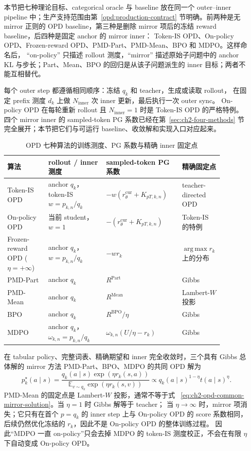 \documentclass[lang=cn,scheme=chinese,openany]{../book/elegantbook}
\DeclareMathOperator*{\argmax}{arg\,max}
\begin{document}
本节把七种理论目标、categorical oracle 与 baseline 放在同一个 outer--inner pipeline 中；生产支持范围由第~\ref{opd:production-contract} 节明确。前两种是无 mirror 正则的 OPD baseline，第三种是删除 mirror 项后的冻结 reward baseline，后四种是固定 anchor 的 mirror inner： Token-IS OPD、On-policy OPD、Frozen-reward OPD、PMD-Part、PMD-Mean、BPO 和 MDPO。这样命名后， ``on-policy'' 只描述 rollout 测度，``mirror'' 描述原始子问题中的 anchor KL 与步长；Part、Mean、BPO 的回归是从该子问题派生的 inner 目标；两者不能互相替代。

每个 outer step 都遵循相同顺序：冻结 $q_k$ 和 teacher，生成或读取 rollout， 在固定 prefix 测度 $d_k$ 上做 $N_{\mathrm{inner}}$ 次 inner 更新，最后执行一次 outer sync。 On-policy OPD 在每轮重新 rollout 且 $N_{\mathrm{inner}}=1$ 时是 Token-IS OPD 的严格特例。四个 mirror inner 的 sampled-token PG 系数已经在第~\ref{sec:ch2-four-methods} 节完全展开；本节把它们与可运行 baseline、收敛解和实现入口对应起来。

\begin{table}[ht]
\centering
\caption{OPD 七种算法的训练测度、PG 系数与精确 inner 固定点}
\label{tab:ch2-opd-seven-algorithms}
\begin{tabular}{p{0.17\linewidth}p{0.24\linewidth}p{0.30\linewidth}p{0.17\linewidth}}
\toprule
算法 & rollout / inner 测度 & sampled-token PG 系数 & 精确固定点 \\
\midrule
Token-IS OPD & anchor $q_k$，token-IS $w=p_{k,n}/q_k$ & $-w(r_\theta^{\mathrm{cur}}+K_{pT,k,n})$ & teacher-directed OPD \\
On-policy OPD & 当前 student，$w=1$ & $-(r_\theta^{\mathrm{cur}}+K_{pT,k,n})$ & Token-IS 的特例 \\
Frozen-reward OPD ($\eta=+\infty$) & anchor $q_k$，$w=p_{k,n}/q_k$ & $-w r_k$ & $\argmax r_k$ 上的分布 \\
PMD-Part & anchor $q_k$ & $R^{\mathrm{Part}}$ & Gibbs \\
PMD-Mean & anchor $q_k$ & $R^{\mathrm{Mean}}$ & Lambert-$W$ 投影 \\
BPO & anchor $q_k$ & $R^{\mathrm{BPO}}/\eta$ & Gibbs \\
MDPO & anchor $q_k$，$\omega_{k,n}=p_{k,n}/q_k$ & $\omega_{k,n}(U/\eta-r_k)$ & Gibbs \\
\bottomrule
\end{tabular}
\end{table}

在 tabular policy、完整词表、精确期望和 inner 完全收敛时，三个具有 Gibbs 总体解的 mirror 方法 PMD-Part、BPO、MDPO 的共同 OPD 解为
\begin{equation}
\label{eq:ch2-opd-common-mirror-solution}
p^{\star}_{k}(a\mid s)
=\frac{q_k(a\mid s)\exp(\eta r_k(s,a))}
{\mathbb E_{v\sim q_k}\exp(\eta r_k(s,v))}
\propto q_k(a\mid s)^{1-\eta}t(a\mid s)^{\eta}.
\end{equation}
PMD-Mean 的固定点是 Lambert-$W$ 投影，通常不等于式 ~\eqref{eq:ch2-opd-common-mirror-solution}。当 $\eta=1$ 时 Gibbs 解等于 teacher； 当 $\eta\to\infty$ 时，mirror 项消失；它只有在首个 $p=q_k$ 的 inner step 上与 On-policy OPD 的 score 系数相同，后续仍然优化冻结的 $r_k$，因此不是 On-policy OPD 的整体训练过程。 因此“MDPO 一直 on-policy”只会去掉 MDPO 的 token-IS 测度校正，不会在有限 $\eta$ 下自动变成 On-policy OPD。
\end{document}

